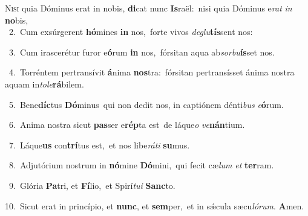 \lettrine{\initial\textcolor{\initialcolor}{N}}{isi} quia Dóminus erat in nobis, \textbf{di}\-cat nunc \textbf{Is}\-raël:~\star nisi quia Dóminus e\textit{rat} \textit{in} \textbf{no}\-bis,\\
{\numbfont\textcolor{\numbcolor}{~2.}}~Cum exsúrgerent \textbf{hó}\-mines \textbf{in} nos,~\star forte vivos \textit{de}\-\textit{glu}\textbf{tís}sent nos:\par
{\numbfont\textcolor{\numbcolor}{~3.}}~Cum irascerétur furor e\-\textbf{ó}\-rum \textbf{in} nos,~\star fórsitan aqua ab\-\textit{sor}\-\textit{bu}\textbf{ís}set nos.\par
{\numbfont\textcolor{\numbcolor}{~4.}}~Torréntem pertransívit \textbf{á}\-nima \textbf{nos}\-tra:~\star fórsitan pertransísset ánima nostra aquam in\-\textit{to}\-\textit{le}\textbf{rá}bilem.\par
{\numbfont\textcolor{\numbcolor}{~5.}}~Bene\-\textbf{díc}\-tus \textbf{Dó}\-minus~\star qui non dedit nos, in captiónem dénti\textit{bus} \textit{e}\-\textbf{ó}rum.\par
{\numbfont\textcolor{\numbcolor}{~6.}}~Anima nostra sicut \textbf{pas}\-ser e\-\textbf{rép}\-ta est~\star de láque\textit{o} \textit{ve}\-\textbf{nán}tium.\par
{\numbfont\textcolor{\numbcolor}{~7.}}~Láque\textbf{us} con\-\textbf{trí}\-tus est,~\star et nos libe\-\textit{rá}\-\textit{ti} \textbf{su}\-mus.\par
{\numbfont\textcolor{\numbcolor}{~8.}}~Adjutórium nostrum in \textbf{nó}\-mine \textbf{Dó}\-mini,~\star qui fecit cæ\textit{lum} \textit{et} \textbf{ter}\-ram.\par
{\numbfont\textcolor{\numbcolor}{~9.}}~Glória \textbf{Pa}\-tri, et \textbf{Fí}\-lio,~\star et Spirí\-\textit{tu}\-\textit{i} \textbf{Sanc}\-to.\par
{\numbfont\textcolor{\numbcolor}{10.}}~Sicut erat in princípio, et \textbf{nunc}\-, et \textbf{sem}\-per,~\star et in sǽcula sæcu\-\textit{ló}\-\textit{rum}. \textbf{A}\-men.\par

